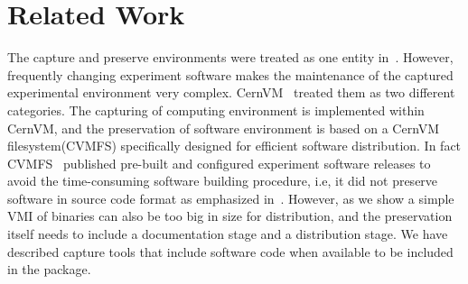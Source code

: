 \section{Related Work}


The capture and preserve environments were treated as one entity in~\cite{matthews2009towards,hong2010software}. 
However, frequently changing experiment software makes the maintenance of the captured experimental environment very complex. 
CernVM~\cite{buncic2010cernvm} treated them as two different categories. 
The capturing of computing environment is implemented within CernVM, and the preservation of software environment is based on a CernVM filesystem(CVMFS) specifically designed for efficient software distribution.
In fact CVMFS~\cite{buncic2010cernvm} published pre-built and configured experiment software releases to avoid the time-consuming software building procedure, i.e, it did not 
preserve software in source code format as emphasized in~\cite{zabolitzky2002preserving,castagne2013consider}. 
However, as we show a simple VMI of binaries can also be too big in size for distribution, and the preservation itself needs to include a documentation stage and a distribution stage. 
We have described capture tools that include software code when available to be included in the package. 

